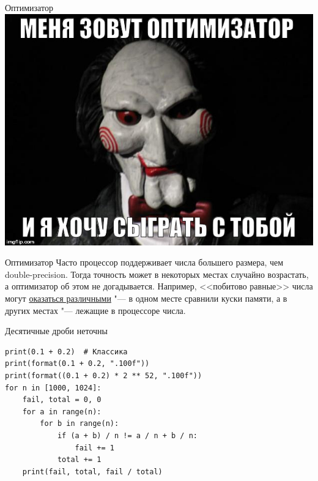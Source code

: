 \begin{frame}{Оптимизатор}
	\includegraphics[scale=0.5]{optimizer-game.jpg}
\end{frame}

\begin{frame}{Оптимизатор}
	Часто процессор поддерживает числа большего размера, чем double-precision.
	Тогда точность может в некоторых местах случайно возрастать, а оптимизатор об этом не догадывается.
	Например, <<побитово равные>> числа могут \href{http://codeforces.com/blog/entry/1059}{оказаться различными} "--- в одном месте сравнили куски памяти,
	а в других местах "--- лежащие в процессоре числа.
\end{frame}

\begin{frame}[fragile]{Десятичные дроби неточны}
\begin{verbatim}
print(0.1 + 0.2)  # Классика
print(format(0.1 + 0.2, ".100f"))
print(format((0.1 + 0.2) * 2 ** 52, ".100f"))
for n in [1000, 1024]:
    fail, total = 0, 0
    for a in range(n):
        for b in range(n):
            if (a + b) / n != a / n + b / n:
                fail += 1
            total += 1
    print(fail, total, fail / total)
\end{verbatim}
\end{frame}

